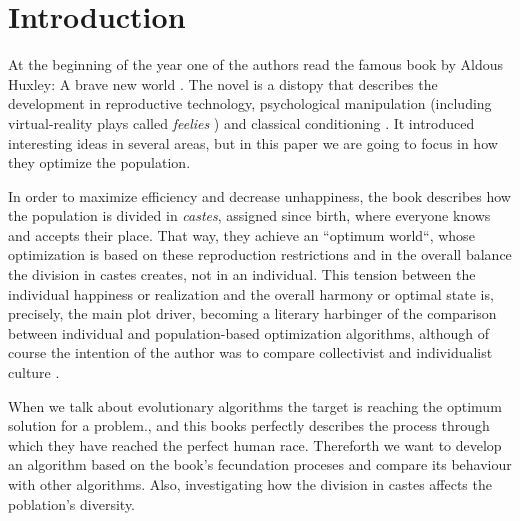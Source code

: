 \section{Introduction}


At the beginning of the year one of the authors read the famous book
by Aldous Huxley: A brave new world \cite{huxley2007brave}. The novel
is a distopy that describes the development in reproductive
technology, psychological manipulation (including virtual-reality
plays called {\em feelies} \cite{lecakes2021matrix}) and classical
conditioning \cite{bernheim2002addiction}. It introduced interesting
ideas in several areas, but in this paper we are going to focus in how
they optimize the population.

In order to maximize efficiency and decrease unhappiness, the book
describes how the population is divided in \textit{castes}, assigned
since birth, where everyone knows and accepts their place. That way,
they achieve an ``optimum world``, whose optimization is based on
these reproduction restrictions and in the overall balance the division in
castes creates, not in an individual. This tension between the
individual happiness or realization and the overall harmony or optimal
state is, precisely, the main plot driver, becoming a literary
harbinger of the comparison between individual and population-based
optimization algorithms, although of course the intention of the
author was to compare collectivist and individualist culture
\cite{mathews2012happiness}.

When we talk about evolutionary algorithms the target is reaching the
optimum solution for a problem., and this books perfectly describes
the process through which they have reached the perfect human
race. Thereforth we want to develop an algorithm based on the book's
fecundation proceses and compare its behaviour with other
algorithms. Also, investigating how the division in castes affects the
poblation's diversity.


